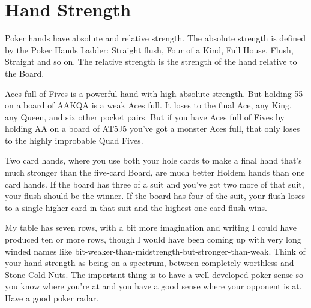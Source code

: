 \chapter{Hand Strength}


Poker hands have absolute and relative strength.
The absolute strength is defined by the Poker Hands Ladder:
Straight flush, Four of a Kind, Full House, Flush, Straight
and so on. The relative strength is the strength of the
hand relative to the Board.

Aces full of Fives is a powerful hand with high absolute strength.
But holding 55 on a board of AAKQA is a weak Aces full. It loses
to the final Ace, any King, any Queen, and six other pocket pairs.
But if you have Aces full of Fives by holding AA on a board of AT5J5
you've got a monster Aces full, that only loses to the highly
improbable Quad Fives.

Two card hands, where you use both your hole cards to make a final
hand that's much stronger than the five-card Board, are much
better Holdem hands than one card hands. If the board has
three of a suit and you've got two more of that suit, your flush
should be the winner. If the board has four of the suit, your
flush loses to a single higher card in that suit and the highest
one-card flush wins.



My table has seven rows, with a bit more imagination and writing
I could have produced ten or more rows, though I would have been
coming up with very long winded names like
bit-weaker-than-midstrength-but-stronger-than-weak. Think of
your hand strength as being on a spectrum, between completely
worthless and Stone Cold Nuts. The important thing is to have
a well-developed poker sense so you know where you're at and you
have a good sense where your opponent is at. Have a good poker radar.
